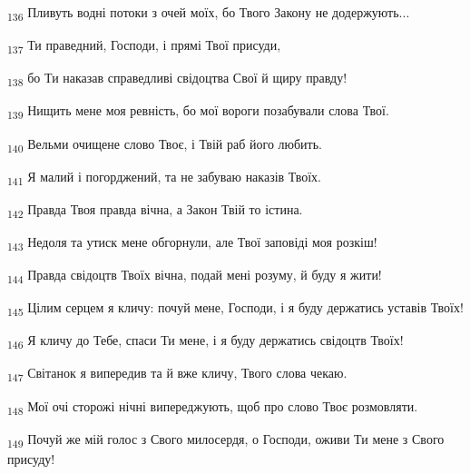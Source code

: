 \begin{tcolorbox}
\textsubscript{136} Пливуть водні потоки з очей моїх, бо Твого Закону не додержують...
\end{tcolorbox}
\begin{tcolorbox}
\textsubscript{137} Ти праведний, Господи, і прямі Твої присуди,
\end{tcolorbox}
\begin{tcolorbox}
\textsubscript{138} бо Ти наказав справедливі свідоцтва Свої й щиру правду!
\end{tcolorbox}
\begin{tcolorbox}
\textsubscript{139} Нищить мене моя ревність, бо мої вороги позабували слова Твої.
\end{tcolorbox}
\begin{tcolorbox}
\textsubscript{140} Вельми очищене слово Твоє, і Твій раб його любить.
\end{tcolorbox}
\begin{tcolorbox}
\textsubscript{141} Я малий і погорджений, та не забуваю наказів Твоїх.
\end{tcolorbox}
\begin{tcolorbox}
\textsubscript{142} Правда Твоя правда вічна, а Закон Твій то істина.
\end{tcolorbox}
\begin{tcolorbox}
\textsubscript{143} Недоля та утиск мене обгорнули, але Твої заповіді моя розкіш!
\end{tcolorbox}
\begin{tcolorbox}
\textsubscript{144} Правда свідоцтв Твоїх вічна, подай мені розуму, й буду я жити!
\end{tcolorbox}
\begin{tcolorbox}
\textsubscript{145} Цілим серцем я кличу: почуй мене, Господи, і я буду держатись уставів Твоїх!
\end{tcolorbox}
\begin{tcolorbox}
\textsubscript{146} Я кличу до Тебе, спаси Ти мене, і я буду держатись свідоцтв Твоїх!
\end{tcolorbox}
\begin{tcolorbox}
\textsubscript{147} Світанок я випередив та й вже кличу, Твого слова чекаю.
\end{tcolorbox}
\begin{tcolorbox}
\textsubscript{148} Мої очі сторожі нічні випереджують, щоб про слово Твоє розмовляти.
\end{tcolorbox}
\begin{tcolorbox}
\textsubscript{149} Почуй же мій голос з Свого милосердя, о Господи, оживи Ти мене з Свого присуду!
\end{tcolorbox}
